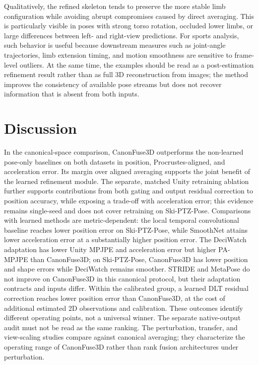 \documentclass[preprint,12pt]{elsarticle}
\begin{document}
Qualitatively, the refined skeleton tends to preserve the more stable limb configuration while avoiding abrupt compromises caused by direct averaging. This is particularly visible in poses with strong torso rotation, occluded lower limbs, or large differences between left- and right-view predictions. For sports analysis, such behavior is useful because downstream measures such as joint-angle trajectories, limb extension timing, and motion smoothness are sensitive to frame-level outliers. At the same time, the examples should be read as a post-estimation refinement result rather than as full 3D reconstruction from images; the method improves the consistency of available pose streams but does not recover information that is absent from both inputs.

\FloatBarrier
\section{Discussion}
\label{sec:discussion}

In the canonical-space comparison, CanonFuse3D outperforms the non-learned pose-only baselines on both datasets in position, Procrustes-aligned, and acceleration error. Its margin over aligned averaging supports the joint benefit of the learned refinement module. The separate, matched Unity retraining ablation further supports contributions from both gating and output residual correction to position accuracy, while exposing a trade-off with acceleration error; this evidence remains single-seed and does not cover retraining on Ski-PTZ-Pose. Comparisons with learned methods are metric-dependent: the local temporal convolutional baseline reaches lower position error on Ski-PTZ-Pose, while SmoothNet attains lower acceleration error at a substantially higher position error. The DeciWatch adaptation has lower Unity MPJPE and acceleration error but higher PA-MPJPE than CanonFuse3D; on Ski-PTZ-Pose, CanonFuse3D has lower position and shape errors while DeciWatch remains smoother. STRIDE and MetaPose do not improve on CanonFuse3D in this canonical protocol, but their adaptation contracts and inputs differ. Within the calibrated group, a learned DLT residual correction reaches lower position error than CanonFuse3D, at the cost of additional estimated 2D observations and calibration. These outcomes identify different operating points, not a universal winner. The separate native-output audit must not be read as the same ranking. The perturbation, transfer, and view-scaling studies compare against canonical averaging; they characterize the operating range of CanonFuse3D rather than rank fusion architectures under perturbation.
\end{document}

